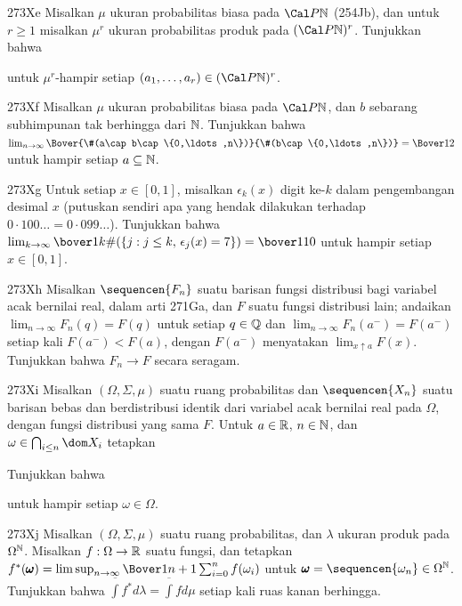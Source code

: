 {\sqheader 273Xe Misalkan $\mu$ ukuran probabilitas biasa pada
$\Cal P\Bbb N$ (254Jb), dan untuk $r\ge 1$ misalkan $\mu^r$ ukuran
probabilitas produk pada $(\Cal P\Bbb N)^r$. Tunjukkan bahwa



\noindent untuk $\mu^r$-hampir setiap
$(a_1,\ldots,a_r)\in(\Cal P\Bbb N)^r$.

\spheader 273Xf Misalkan $\mu$ ukuran probabilitas biasa pada
$\Cal P\Bbb N$, dan $b$ sebarang subhimpunan tak berhingga dari
$\Bbb N$. Tunjukkan bahwa
$\lim_{n\to\infty}
\Bover{\#(a\cap b\cap\{0,\ldots,n\})}{\#(b\cap\{0,\ldots,n\})}
\penalty-100=\Bover12$ untuk hampir setiap $a\subseteq\Bbb N$.

\sqheader 273Xg Untuk setiap $x\in[0,1]$, misalkan $\epsilon_k(x)$ digit
ke-$k$ dalam pengembangan desimal $x$ (putuskan sendiri apa yang hendak
dilakukan terhadap $0{\cdot}100\ldots=0{\cdot}099\ldots$). Tunjukkan
bahwa
$\lim_{k\to\infty}\bover1k\#(\{j:j\le k,\,\epsilon_j(x)=7\})
=\bover1{10}$ untuk hampir setiap $x\in[0,1]$.

\spheader 273Xh Misalkan $\sequencen{F_n}$ suatu barisan fungsi
distribusi bagi variabel acak bernilai real, dalam arti 271Ga, dan $F$
suatu fungsi distribusi lain; andaikan
$\lim_{n\to\infty}F_n(q)=F(q)$ untuk setiap $q\in\Bbb Q$ dan
$\lim_{n\to\infty}F_n(a^-)=F(a^-)$ setiap kali $F(a^-)<F(a)$, dengan
$F(a^-)$ menyatakan $\lim_{x\uparrow a}F(x)$. Tunjukkan bahwa
$F_n\to F$ secara seragam.

\sqheader 273Xi
Misalkan $(\Omega,\Sigma,\mu)$ suatu ruang probabilitas dan
$\sequencen{X_n}$ suatu barisan bebas dan berdistribusi identik dari
variabel acak bernilai real pada $\Omega$, dengan fungsi distribusi yang
sama $F$. Untuk $a\in\Bbb R$, $n\in\Bbb N$, dan
$\omega\in\bigcap_{i\le n}\dom X_i$ tetapkan


\noindent Tunjukkan bahwa


\noindent untuk hampir setiap $\omega\in\Omega$.

\spheader 273Xj Misalkan $(\Omega,\Sigma,\mu)$ suatu ruang probabilitas,
dan $\lambda$ ukuran produk pada $\Omega^{\Bbb N}$.
Misalkan $f:\Omega\to\Bbb R$ suatu fungsi, dan tetapkan
$f^*(\pmb{\omega})
=\limsup_{n\to\infty}\Bover1{n+1}\sum_{i=0}^nf(\omega_i)$
untuk $\pmb{\omega}=\sequencen{\omega_n}\in\Omega^{\Bbb N}$.
Tunjukkan bahwa
$\overline{\int}f^*d\lambda=\overline{\int}fd\mu$ setiap kali ruas kanan
berhingga.

}
